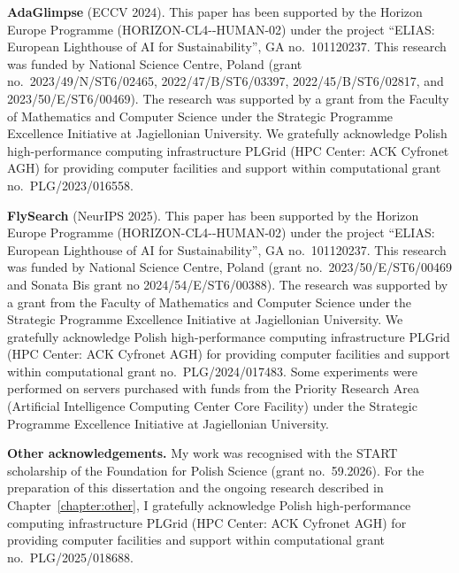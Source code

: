 \vspace{0.5em}
\noindent\textbf{AdaGlimpse} (ECCV 2024). This paper has been supported by the Horizon Europe
Programme (HORIZON-\allowbreak CL4--\allowbreak HUMAN-02) under the project
``ELIAS: European Lighthouse of AI for Sustainability'', GA no.\ 101120237. This research was
funded by National Science Centre, Poland (grant no.\ 2023/49/N/ST6/02465, 2022/47/B/ST6/03397,
2022/45/B/ST6/02817, and 2023/50/E/ST6/00469). The research was supported by a grant from the
Faculty of Mathematics and Computer Science under the Strategic Programme Excellence Initiative at
Jagiellonian University. We gratefully acknowledge Polish high-performance computing infrastructure
PLGrid (HPC Center: ACK Cyfronet AGH) for providing computer facilities and support within
computational grant no.\ PLG/2023/016558.

\vspace{0.5em}
\noindent\textbf{FlySearch} (NeurIPS 2025). This paper has been supported by the Horizon Europe
Programme (HORIZON-\allowbreak CL4--\allowbreak HUMAN-02) under the project
``ELIAS: European Lighthouse of AI for Sustainability'', GA no.\ 101120237. This research was
funded by National Science Centre, Poland (grant no.\ 2023/50/E/ST6/00469 and Sonata Bis grant
no 2024/54/E/ST6/00388). The research was supported by a grant from the Faculty of Mathematics and
Computer Science under the Strategic Programme Excellence Initiative at Jagiellonian University.
We gratefully acknowledge Polish high-performance computing infrastructure PLGrid (HPC Center: ACK
Cyfronet AGH) for providing computer facilities and support within computational grant
no.\ PLG/2024/017483. Some experiments were performed on servers purchased with funds from the
Priority Research Area (Artificial Intelligence Computing Center Core Facility) under the Strategic
Programme Excellence Initiative at Jagiellonian University.

\vspace{0.5em}
\noindent\textbf{Other acknowledgements.} My work was recognised with the START
scholarship of the Foundation for Polish Science (grant no.\ 59.2026). For the preparation of
this dissertation and the ongoing research described in Chapter~\ref{chapter:other}, I
gratefully acknowledge Polish high-performance computing infrastructure PLGrid (HPC Center: ACK
Cyfronet AGH) for providing computer facilities and support within computational grant
no.\ PLG/2025/018688.

\par
\endgroup
